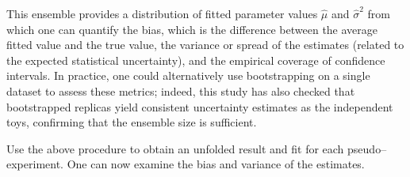             This ensemble provides a distribution of fitted parameter values $\hat{\mu}$ and $\hat{\sigma}^2$ from which one can quantify the bias, which is the difference between the average fitted value and the true value, the variance or spread of the estimates (related to the expected statistical uncertainty), and the empirical coverage of confidence intervals.
            In practice, one could alternatively use bootstrapping on a single dataset to assess these metrics; indeed, this study has also checked that bootstrapped replicas yield consistent uncertainty estimates as the independent toys, confirming that the ensemble size is sufficient.

            Use the above procedure to obtain an unfolded result and fit for each pseudo--experiment.
            One can now examine the bias and variance of the estimates.
            
